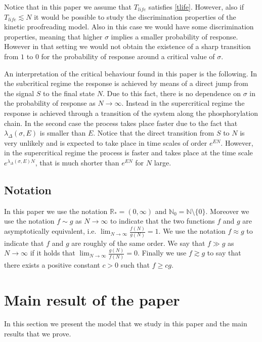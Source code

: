 \documentclass{article}
\numberwithin{equation}{section}
\theoremstyle{plain}
\begin{document}
 





 
Notice that in this paper we assume that $T_{life} $ satisfies \eqref{tlife}.
However, also if $ T_{life} \lesssim N  $ it would be possible to study the discrimination properties of the kinetic proofreading model.
Also in this case we would have some discrimination properties, meaning that higher $\sigma $ implies a smaller probability of response. However in that setting we would not obtain the existence of a sharp transition from $1$ to $0$ for the probability of response around a critical value of $\sigma$. 

An interpretation of the critical behaviour found in this paper is the following. In the subcritical regime the response is achieved by means of a direct jump from the signal $S$ to the final state $N$. Due to this fact, there is no dependence on $\sigma $ in the  probability of response as $N \to \infty $. Instead in the supercritical regime the response is achieved through a transition of the system along the phosphorylation chain. In the second case the process takes place faster due to the fact that $\lambda_\Delta(\sigma, E) $ is smaller than $E$. Notice that the direct transition from $S$ to $N$ is very unlikely and is expected to take place in time scales of order $e^{EN}$. However, in the supercritical regime the process is faster and takes place at the time scale $e^{\lambda_\Delta(\sigma, E) N }$, that is much shorter than $e^{EN}$ for $N $ large. 
  

\subsection{Notation}
In this paper we use the notation $\mathbb R_* = (0, \infty ) $ and $\mathbb N_0 = \mathbb N \setminus \{ 0\} $. 
Moreover we use the notation $ f \sim  g $ as $N \to \infty $ to indicate that the two functions $f$ and  $g $ are asymptotically equivalent, i.e. $\lim_{N \to \infty} \frac{f(N)}{g(N)} =1 $. We use the notation $f \approx g $ to indicate that $f$ and $g$ are roughly of the same order. We say that $f \gg g $ as $N \to \infty $ if it holds that $\lim_{N \to \infty } \frac{g(N)}{f(N)}=0$. 
Finally we use $ f \gtrsim g $ to say that there exists a positive constant $c>0$ such that $f \geq c g $. 

\section{Main result of the paper}
In this section we present the model that we study in this paper and the main results that we prove. 
\end{document}
